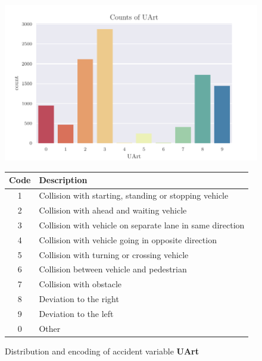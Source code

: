 \begin{figure}[ht]
    \centering
	\includegraphics[scale=1.0]{CorrAnalysis/data/BAYSIS/01_dataset/plots/baysis_dataset_count_UArt}
    \qquad
	\begin{tabular}[b]{c|l}
		\toprule
		Code & Description \\
		\midrule
			1 & Collision with starting, standing or stopping vehicle  \\ 
			2 & Collision with ahead and waiting vehicle  \\
			3 & Collision with vehicle on separate lane in same direction  \\
			4 & Collision with vehicle going in opposite direction  \\
			5 & Collision with turning or crossing vehicle  \\
			6 & Collision between vehicle and pedestrian  \\
			7 & Collision with obstacle  \\
			8 & Deviation to the right  \\
			9 & Deviation to the left  \\
			0 & Other  \\
		\bottomrule
	\end{tabular}
    \captionsetup{labelformat=andtable}
	\caption{Distribution and encoding of accident variable \textbf{UArt}}
\end{figure}
